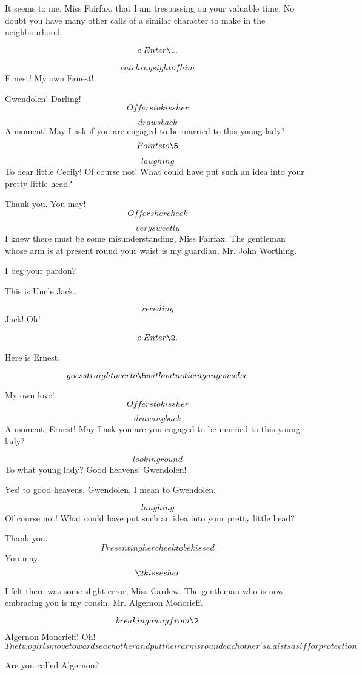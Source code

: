 \documentclass{book}
\begin{document}
\5  It seems to me, Miss Fairfax, that I am trespassing on
your valuable time.  No doubt you have many other calls of a
similar character to make in the neighbourhood.

\[c]Enter \1.\]

\4  \[catching sight of him\]  Ernest!  My own Ernest!

\1  Gwendolen!  Darling!  \[Offers to kiss her\]

\4  \[draws back\]  A moment!  May I ask if you are engaged
to be married to this young lady? \[Points to \5\]

\1  \[laughing\]  To dear little Cecily!  Of course not!  What
could have put such an idea into your pretty little head?

\4  Thank you.  You may!  \[Offers her cheek\]

\5  \[very sweetly\]  I knew there must be some
misunderstanding, Miss Fairfax.  The gentleman whose arm is at
present round your waist is my guardian, Mr. John Worthing.

\4  I beg your pardon?

\5  This is Uncle Jack.

\4  \[receding\] Jack!  Oh!

\[c]Enter \2.\]

\5  Here is Ernest.

\2  \[goes straight over to \5 without noticing any one
else\] 

My own love!  \[Offers to kiss her\]

\5  \[drawing back\]  A moment, Ernest!  May I ask you \textemdash are
you engaged to be married to this young lady?

\2  \[looking round\]  To what young lady?  Good heavens!\break
Gwendolen!

\5  Yes! to good heavens, Gwendolen, I mean to Gwendolen.

\2  \[laughing\]  Of course not!  What could have put such an
idea into your pretty little head?

\5  Thank you.  \[Presenting her cheek to be kissed\]  You may.\hfil\break
\[\2 kisses her\]

\4  I felt there was some slight error, Miss Cardew.  The
gentleman who is now embracing you is my cousin, Mr. Algernon
Moncrieff.

\5  \[breaking away from \2\]  Algernon Moncrieff!  Oh!
\[The two girls move towards each other and put their arms round
each other's waists as if for protection\]

\5  Are you called Algernon?
\end{document}

